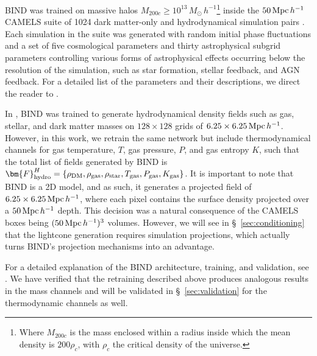 \documentclass[linenumbers,trackchanges, twocolumn]{aastex701}
\begin{document}
BIND was trained on massive halos $M_{200c}\geq10^{13}\,M_\odot\,h^{-1}$\footnote{Where $M_{200c}$ is the mass enclosed within a radius inside which the mean density is $200\rho_c$, with $\rho_c$ the critical density of the universe.} inside the $50\,{\rm Mpc}\,h^{-1}$ CAMELS suite of 1024 dark matter-only and hydrodynamical simulation pairs \citep{Genel-2026}. Each simulation in the suite was generated with random initial phase fluctuations and a set of five cosmological parameters and thirty astrophysical subgrid parameters controlling various forms of astrophysical effects occurring below the resolution of the simulation, such as star formation, stellar feedback, and AGN feedback. For a detailed list of the parameters and their descriptions, we direct the reader to \citet{Genel-2026}.
 
In \citet{Lee-2026b}, BIND was trained to generate hydrodynamical density fields such as gas, stellar, and dark matter masses on $128\times128$ grids of $6.25\times6.25\,{\rm Mpc}\,h^{-1}$. However, in this work, we retrain the same network but include thermodynamical channels for gas temperature, $T$, gas pressure, $P$, and gas entropy $K$, such that the total list of fields generated by BIND is $\bm{F}^H_{\rm hydro} = \{\rho_{\rm DM}, \rho_{\rm gas}, \rho_{\rm star}, T_{\rm gas}, P_{\rm gas}, K_{\rm gas}\}$. It is important to note that BIND is a 2D model, and as such, it generates a projected field of $6.25\times6.25\,{\rm Mpc}\,h^{-1}$, where each pixel contains the surface density projected over a $50\,{\rm Mpc}\,h^{-1}$ depth. This decision was a natural consequence of the CAMELS boxes being $(50\,{\rm Mpc}\,h^{-1})^3$ volumes. However, we will see in \S~\ref{sec:conditioning} that the lightcone generation requires simulation projections, which actually turns BIND's projection mechanisms into an advantage.
 
For a detailed explanation of the BIND architecture, training, and validation, see \citet{Lee-2026b}. We have verified that the retraining described above produces analogous results in the mass channels and will be validated in \S~\ref{sec:validation} for the thermodynamic channels as well.
 
\end{document}
